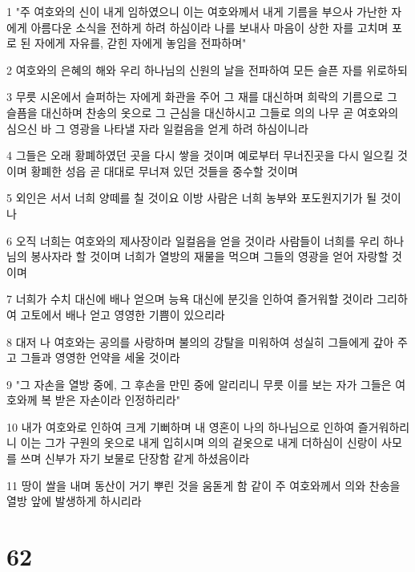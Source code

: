 \par 1 "주 여호와의 신이 내게 임하였으니 이는 여호와께서 내게 기름을 부으사 가난한 자에게 아름다운 소식을 전하게 하려 하심이라 나를 보내사 마음이 상한 자를 고치며 포로 된 자에게 자유를, 갇힌 자에게 놓임을 전파하며"
\par 2 여호와의 은혜의 해와 우리 하나님의 신원의 날을 전파하여 모든 슬픈 자를 위로하되
\par 3 무릇 시온에서 슬퍼하는 자에게 화관을 주어 그 재를 대신하며 희락의 기름으로 그 슬픔을 대신하며 찬송의 옷으로 그 근심을 대신하시고 그들로 의의 나무 곧 여호와의 심으신 바 그 영광을 나타낼 자라 일컬음을 얻게 하려 하심이니라
\par 4 그들은 오래 황폐하였던 곳을 다시 쌓을 것이며 예로부터 무너진곳을 다시 일으킬 것이며 황폐한 성읍 곧 대대로 무너져 있던 것들을 중수할 것이며
\par 5 외인은 서서 너희 양떼를 칠 것이요 이방 사람은 너희 농부와 포도원지기가 될 것이나
\par 6 오직 너희는 여호와의 제사장이라 일컬음을 얻을 것이라 사람들이 너희를 우리 하나님의 봉사자라 할 것이며 너희가 열방의 재물을 먹으며 그들의 영광을 얻어 자랑할 것이며
\par 7 너희가 수치 대신에 배나 얻으며 능욕 대신에 분깃을 인하여 즐거워할 것이라 그리하여 고토에서 배나 얻고 영영한 기쁨이 있으리라
\par 8 대저 나 여호와는 공의를 사랑하며 불의의 강탈을 미워하여 성실히 그들에게 갚아 주고 그들과 영영한 언약을 세울 것이라
\par 9 "그 자손을 열방 중에, 그 후손을 만민 중에 알리리니 무릇 이를 보는 자가 그들은 여호와께 복 받은 자손이라 인정하리라"
\par 10 내가 여호와로 인하여 크게 기뻐하며 내 영혼이 나의 하나님으로 인하여 즐거워하리니 이는 그가 구원의 옷으로 내게 입히시며 의의 겉옷으로 내게 더하심이 신랑이 사모를 쓰며 신부가 자기 보물로 단장함 같게 하셨음이라
\par 11 땅이 쌀을 내며 동산이 거기 뿌린 것을 움돋게 함 같이 주 여호와께서 의와 찬송을 열방 앞에 발생하게 하시리라

\chapter{62}

